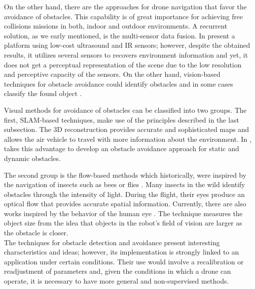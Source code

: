 On the other hand, there are the approaches for drone navigation that favor the avoidance of obstacles. This capability is of great importance for achieving free collisions missions in both, indoor and outdoor environments. A recurrent solution, as we early mentioned, is the multi-sensor data fusion. In \citep{Gageik.Benz.ea:ACCESS:2015} present a platform using low-cost ultrasound and IR sensors; however, despite the obtained results, it utilizes several sensors to recovers environment information and yet, it does not get a perceptual representation of the scene due to the low resolution and perceptive capacity of the sensors. On the other hand, vision-based techniques for obstacle avoidance could identify obstacles and in some cases classify the found object \citep{Li.Ye.ea:IROS:2016}. 

Visual methods for avoidance of obstacles can be classified into two groups. The first, SLAM-based techniques, make use of the principles described in the last subsection. The 3D reconstruction provides accurate and sophisticated maps and allows the air vehicle to travel with more information about the environment. In \citep{Moreno-Armendariz.Calvo:ICMEAE:2014}, takes this advantage to develop an obstacle avoidance approach for static and dynamic obstacles. 

The second group is the flow-based methods which historically, were inspired by the navigation of insects such as bees \citep{Srinivasan.Gregory:PTBS:1992} or flies \citep{Franceschini.Ruffier.ea:InTech:2009}. Many insects in the wild identify obstacles through the intensity of light. During the flight, their eyes produce an optical flow that provides accurate spatial information. Currently, there are also works inspired by the behavior of the human eye \citep{Al-Kaff.Meng.ea:IVS:2016}. The technique measures the object size from the idea that objects in the robot's field of vision are larger as the obstacle is closer.\\

The techniques for obstacle detection and avoidance present interesting characteristics and ideas; however, its implementation is strongly linked to an application under certain conditions. Their use would involve a recalibration or readjustment of parameters and, given the conditions in which a drone can operate, it is necessary to have more general and non-supervised methods.

